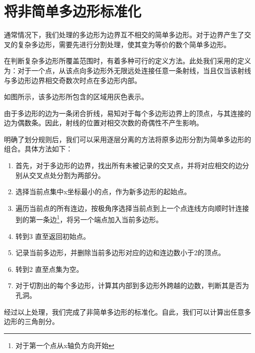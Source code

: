 \chapter{将非简单多边形标准化}
通常情况下，我们处理的多边形为边界互不相交的简单多边形。对于边界产生了交叉的复杂多边形，需要先进行分割处理，使其变为等价的数个简单多边形。

在判断复杂多边形所覆盖范围时，有着多种可行的定义方法。此处我们采用的定义为：对于一个点，从该点向多边形外无限远处连接任意一条射线，当且仅当该射线与多边形边界相交奇数次时点在多边形内部。

如图所示，该多边形所包含的区域用灰色表示。

由于多边形的边为一条闭合折线，易知对于每个多边形边界上的顶点，与其连接的边为偶数条。因此，射线的位置对相交次数的奇偶性不产生影响。

明确了划分规则后，我们可以采用逐层分离的方法将原多边形分割为简单多边形的组合。具体方法如下：

\begin{enumerate}
    \item 首先，对于多边形的边界，找出所有未被记录的交叉点，并将对应相交的边分别从交叉点处分割为两部分。
    \item 选择当前点集中x坐标最小的点，作为新多边形的起始点。
    \item 遍历当前点的所有连边，按极角序选择当前点到上一个点连线方向顺时针连接到的第一条边\footnote{对于第一个点从x轴负方向开始}，将另一个端点加入当前多边形。
    \item 转到3 直至返回初始点。
    \item 记录当前多边形，并删除当前多边形对应的边和连边数小于2的顶点。
    \item 转到2 直至点集为空。
    \item 对于切割出的每个多边形，计算其内部到多边形外跨越的边数，判断其是否为孔洞。
\end{enumerate}

经过以上处理，我们完成了非简单多边形的标准化。自此，我们可以计算出任意多边形的三角剖分。
